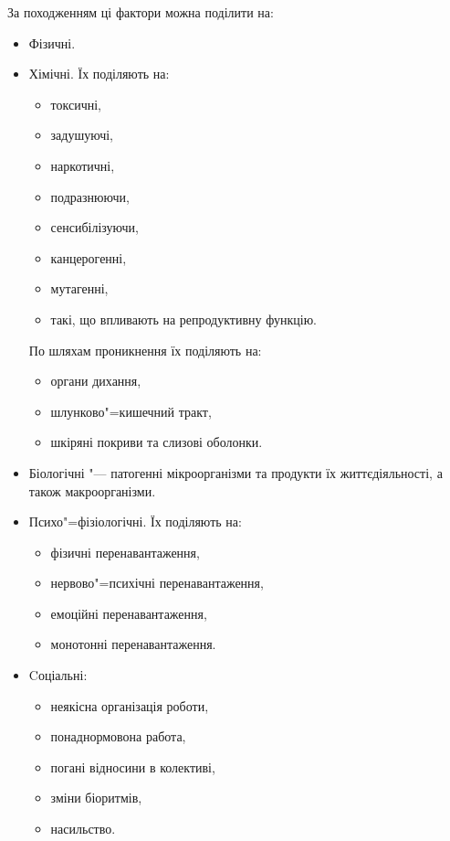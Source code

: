 \documentclass[a5paper,10pt,notitlepage,pdftex,headsepline]{scrartcl}
\begin{document}
  За походженням ці фактори можна поділити на:
  \begin{itemize}
    \item Фізичні.
    \item Хімічні.
      Їх поділяють на:
      \begin{itemize}
        \item токсичні,
        \item задушуючі,
        \item наркотичні,
        \item подразнюючи,
        \item сенсибілізуючи,
        \item канцерогенні,
        \item мутагенні,
        \item такі, що впливають на репродуктивну функцію.
      \end{itemize}

      По шляхам проникнення їх поділяють на:
      \begin{itemize}
        \item органи дихання,
        \item шлунково"=кишечний тракт,
        \item шкіряні покриви та слизові оболонки.
      \end{itemize}
    \item Біологічні "--- патогенні мікроорганізми та продукти їх
      життєдіяльності, а також макроорганізми.
    \item Психо"=фізіологічні.
      Їх поділяють на:
      \begin{itemize}
        \item фізичні перенавантаження,
        \item нервово"=психічні перенавантаження,
        \item емоційні перенавантаження,
        \item монотонні перенавантаження.
      \end{itemize}
    \item Cоціальні:
      \begin{itemize}
        \item неякісна організація роботи,
        \item понаднормовона работа,
        \item погані відносини в колективі,
        \item зміни біоритмів,
        \item насильство.
      \end{itemize}
  \end{itemize}
\end{document}
